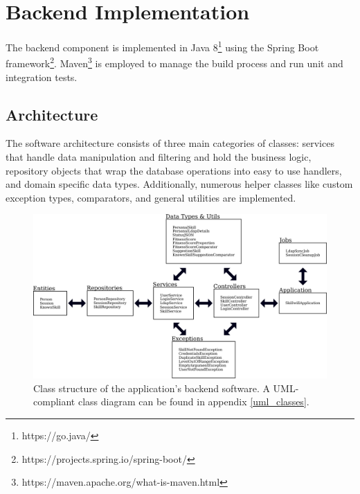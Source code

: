 
\newpage

\section{Backend Implementation}
\label{impl:be}
The backend component is implemented in Java 8\footnote{https://go.java/} using the Spring Boot framework\footnote{https://projects.spring.io/spring-boot/}. Maven\footnote{https://maven.apache.org/what-is-maven.html} is employed to manage the build process and run unit and integration tests.

\subsection{Architecture}
The software architecture consists of three main categories of classes: services that handle data manipulation and filtering and hold the business logic, repository objects that wrap the database operations into easy to use handlers, and domain specific data types. Additionally, numerous helper classes like custom exception types, comparators, and general utilities are implemented.
\begin{figure}[!h]
    \centering
    \includegraphics[width=\textwidth]{images/be_structure.png}
    \caption[Diagram: Backend Classes]{Class structure of the application's backend software. A UML-compliant class diagram can be found in appendix \ref{uml_classes}.}
    \label{fig:markovchain}
\end{figure}

